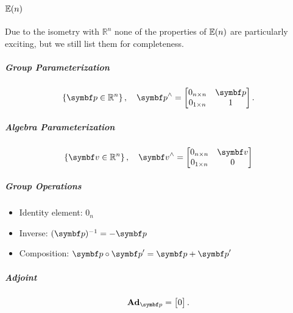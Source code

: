 \chapter{$\En$}

Due to the isometry with $\mathbb{R}^{n}$ none of the properties of $\En$ are particularly exciting, but we still list them for completeness.

\begin{properties}[breakable, title={$\En$ parameterized by $\mathbb{R}^{n}$}]
\paragraph{Group Parameterization}
\begin{equation}
  \left\{ \bp \in \mathbb{R}^{n} \right\}, \quad \bp^{\wedge} = \begin{bmatrix} 0_{n \times n} & \bp \\ 0_{1 \times n} & 1\end{bmatrix}.
\end{equation}

\paragraph{Algebra Parameterization}
\begin{equation}
  \left\{ \bv \in \mathbb{R}^{n} \right\}, \quad \bv^{\wedge} = \begin{bmatrix} 0_{n \times n} & \bv \\ 0_{1 \times n} & 0 \end{bmatrix}
\end{equation}

\paragraph{Group Operations}
\begin{itemize}
  \item Identity element: $0_{n}$
  \item Inverse: $(\bp)^{-1} = -\bp$
  \item Composition: $\bp \circ \bp' = \bp + \bp'$
\end{itemize}

\paragraph{Adjoint}
\begin{equation}
  \bAd_{\bp} = \begin{bmatrix} 0 \end{bmatrix}.
\end{equation}


\end{properties}
